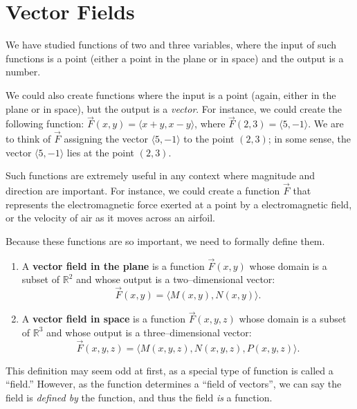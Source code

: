\section{Vector Fields}\label{sec:vector_fields}

We have studied functions of two and three variables, where the input of such functions is a point (either a point in the plane or in space) and the output is a number.

We could also create functions where the input is a point (again, either in the plane or in space), but the output is a {\em vector}. For instance, we could create the following function: $\vec F(x,y) = \langle x+y, x-y\rangle$, where $\vec F(2,3) = \langle 5,-1\rangle$. We are to think of $\vec F$ assigning the vector $\langle 5,-1\rangle$ to the point $(2,3)$; in some sense, the vector $\langle 5,-1\rangle$ lies at the point $(2,3)$. 

Such functions are extremely useful in any context where magnitude and direction are important. For instance, we could create a function $\vec F$ that represents the electromagnetic force exerted at a point by a electromagnetic field, or the velocity of air as it moves across an airfoil. 

Because these functions are so important, we need to formally define them.

{\begin{enumerate}
	\item A \textbf{vector field in the plane} is a function $\vec F(x,y)$ whose domain is a subset of $\mathbb{R}^2$ and whose output is a two--dimensional vector:
	$$\vec F(x,y) = \langle M(x,y), N(x,y)\rangle.$$
	
	\item A \textbf{vector field in space} is a function $\vec F(x,y,z)$ whose domain is a subset of $\mathbb{R}^3$ and whose output is a three--dimensional vector:
	$$\vec F(x,y,z) = \langle M(x,y,z), N(x,y,z), P(x,y,z)\rangle.$$
\end{enumerate}
}

This definition may seem odd at first, as a special type of function is called a ``field.'' However, as the function determines a ``field of vectors'', we can say the field is \emph{defined by} the function, and thus the field \emph{is} a function.


